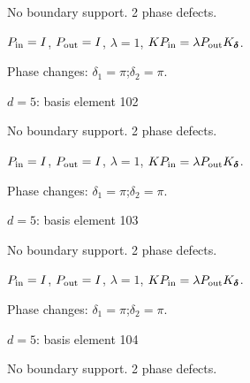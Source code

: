 No boundary support. 2 phase defects.
\begin{center}
\end{center}
\vspace{-1mm}
$P_{\rm in}=I$, \quad $P_{\rm out}=I$, \quad $\lambda=1$, \qquad $K P_{\rm in}=\lambda P_{\rm out}K_{\boldsymbol\delta}$.
\par\smallskip\begin{minipage}{.98\linewidth}\small Phase changes: $\delta_{1}=\pi$;\quad $\delta_{2}=\pi$.\end{minipage}
\vfill
{\footnotesize\texttt{}}
\newpage
{}
{\Large $d=5$: basis element 102}\par
No boundary support. 2 phase defects.
\begin{center}
\end{center}
\vspace{-1mm}
$P_{\rm in}=I$, \quad $P_{\rm out}=I$, \quad $\lambda=1$, \qquad $K P_{\rm in}=\lambda P_{\rm out}K_{\boldsymbol\delta}$.
\par\smallskip\begin{minipage}{.98\linewidth}\small Phase changes: $\delta_{1}=\pi$;\quad $\delta_{2}=\pi$.\end{minipage}
\vfill
{\footnotesize\texttt{}}
\newpage
{}
{\Large $d=5$: basis element 103}\par
No boundary support. 2 phase defects.
\begin{center}
\end{center}
\vspace{-1mm}
$P_{\rm in}=I$, \quad $P_{\rm out}=I$, \quad $\lambda=1$, \qquad $K P_{\rm in}=\lambda P_{\rm out}K_{\boldsymbol\delta}$.
\par\smallskip\begin{minipage}{.98\linewidth}\small Phase changes: $\delta_{1}=\pi$;\quad $\delta_{2}=\pi$.\end{minipage}
\vfill
{\footnotesize\texttt{}}
\newpage
{}
{\Large $d=5$: basis element 104}\par
No boundary support. 2 phase defects.
\begin{center}
\end{center}
